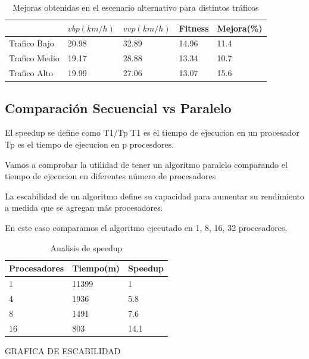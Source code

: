 \begin{table}[h]
	\renewcommand{\arraystretch}{1.2}
	\caption{Mejoras obtenidas en el escenario alternativo para distintos tráficos }
	\label{table:mejoras_trafico_alternativo}
	\centering
	\begin{tabular}{p{3.5cm}p{2.5cm}p{2.5cm}p{2cm}p{2cm} }
		\hline
		&
		$vbp(km/h)$& 
		$vvp(km/h)$ & 
		Fitness &
		Mejora(\%)
		\\ 
		\hline

		Trafico Bajo & 20.98  & 32.89 & 14.96 & 11.4\\
		Trafico Medio  & 19.17  & 28.88& 13.34 & 10.7\\	
		Trafico Alto  & 19.99  & 27.06& 13.07 & 15.6\\		
		\hline
	\end{tabular}
\end{table}


\subsection{Comparación Secuencial vs  Paralelo}

El speedup se define como T1/Tp
T1 es el tiempo de ejecucion en un procesador
Tp es el tiempo de ejecucion en p procesdores.


Vamos a comprobar la utilidad de tener un algoritmo paralelo comparando el tiempo de ejecucion en diferentes número de procesadores

La escabilidad de un algoritmo define su capacidad para aumentar su rendimiento a medida que se agregan más procesadores.

En este caso comparamos el algoritmo ejecutado en 1, 8, 16, 32 procesadores.



\begin{table}[h]
	\renewcommand{\arraystretch}{1.2}
	\caption{Analisis de speedup }
	\label{table:analisis_speedup}
	\centering
	\begin{tabular}{p{2.5cm}p{2.5cm}p{2.5cm} }
		\hline

		Procesadores& 
		Tiempo(m) & 
		Speedup 
		\\ 
		\hline
		1  & 11399 & 1\\
		4  & 1936 & 5.8 \\
		8  & 1491 & 7.6 \\
		16  & 803 & 14.1 \\
		\hline
	\end{tabular}
\end{table}
GRAFICA DE ESCABILIDAD

